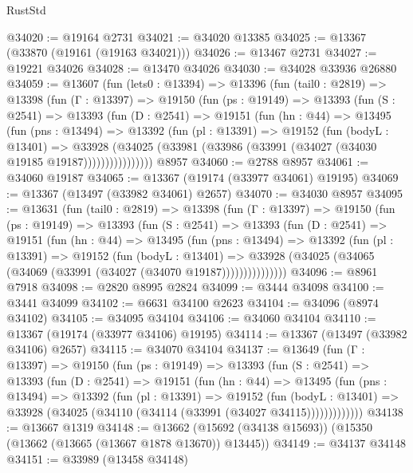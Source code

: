 \begin{lexlean}{RustStd}
\begin{coremodule}
@34020 := @19164 @2731
@34021 := @34020 @13385
@34025 := @13367 (@33870 (@19161 (@19163 @34021)))
@34026 := @13467 @2731
@34027 := @19221 @34026
@34028 := @13470 @34026
@34030 := @34028 @33936 @26880
@34059 := @13607
    (fun (lets0 : @13394) =>
    @13396
      (fun (tail0 : @2819) =>
      @13398
        (fun (Γ : @13397) =>
        @19150
          (fun (ps : @19149) =>
          @13393
            (fun (S : @2541) =>
            @13393
              (fun (D : @2541) =>
              @19151
                (fun (hn : @44) =>
                @13495
                  (fun (pns : @13494) =>
                  @13392
                    (fun (pl : @13391) =>
                    @19152
                      (fun (bodyL : @13401) =>
                      @33928
                        (@34025
                          (@33981 (@33986 (@33991 (@34027 (@34030 @19185 @19187))))))))))))))))
    @8957
@34060 := @2788 @8957
@34061 := @34060 @19187
@34065 := @13367 (@19174 (@33977 @34061) @19195)
@34069 := @13367 (@13497 (@33982 @34061) @2657)
@34070 := @34030 @8957
@34095 := @13631
    (fun (tail0 : @2819) =>
    @13398
      (fun (Γ : @13397) =>
      @19150
        (fun (ps : @19149) =>
        @13393
          (fun (S : @2541) =>
          @13393
            (fun (D : @2541) =>
            @19151
              (fun (hn : @44) =>
              @13495
                (fun (pns : @13494) =>
                @13392
                  (fun (pl : @13391) =>
                  @19152
                    (fun (bodyL : @13401) =>
                    @33928 (@34025 (@34065 (@34069 (@33991 (@34027 (@34070 @19187)))))))))))))))
@34096 := @8961 @7918
@34098 := @2820 @8995 @2824
@34099 := @3444 @34098
@34100 := @3441 @34099
@34102 := @6631 @34100 @2623
@34104 := @34096 (@8974 @34102)
@34105 := @34095 @34104
@34106 := @34060 @34104
@34110 := @13367 (@19174 (@33977 @34106) @19195)
@34114 := @13367 (@13497 (@33982 @34106) @2657)
@34115 := @34070 @34104
@34137 := @13649
    (fun (Γ : @13397) =>
    @19150
      (fun (ps : @19149) =>
      @13393
        (fun (S : @2541) =>
        @13393
          (fun (D : @2541) =>
          @19151
            (fun (hn : @44) =>
            @13495
              (fun (pns : @13494) =>
              @13392
                (fun (pl : @13391) =>
                @19152
                  (fun (bodyL : @13401) =>
                  @33928 (@34025 (@34110 (@34114 (@33991 (@34027 @34115)))))))))))))
@34138 := @13667 @1319
@34148 := @13662 (@15692 (@34138 @15693)) (@15350 (@13662 (@13665 (@13667 @1878 @13670)) @13445))
@34149 := @34137 @34148
@34151 := @33989 (@13458 @34148)

\end{coremodule}
\end{lexlean}
